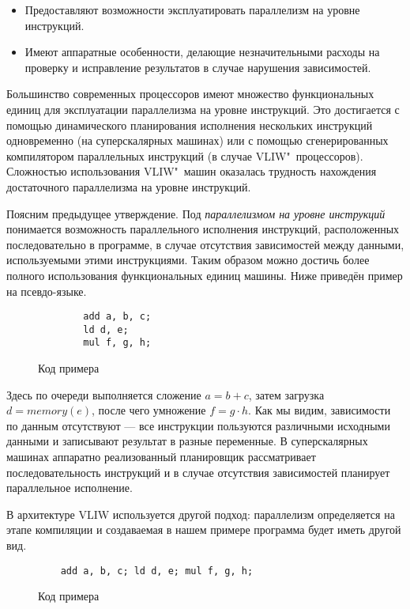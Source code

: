 \begin{itemize}
	\item Предоставляют возможности эксплуатировать параллелизм на уровне инструкций.
	\item Имеют аппаратные особенности, делающие незначительными расходы на проверку и исправление результатов в случае нарушения зависимостей.
\end{itemize}

Большинство современных процессоров имеют множество функциональных единиц для эксплуатации параллелизма на уровне инструкций. Это достигается с помощью динамического планирования исполнения нескольких инструкций одновременно \cite{dynamic-scheduling} (на суперскалярных машинах) или с помощью сгенерированных компилятором параллельных инструкций \cite{vliw} (в случае VLIW"~процессоров). Сложностью использования VLIW"~машин оказалась трудность нахождения достаточного параллелизма на уровне инструкций.

Поясним предыдущее утверждение. Под \emph{параллелизмом на уровне инструкций} понимается возможность параллельного исполнения инструкций, расположенных последовательно в программе, в случае отсутствия зависимостей между данными, используемыми этими инструкциями. Таким образом можно достичь более полного использования функциональных единиц машины. Ниже приведён пример на псевдо-языке.

\begin{figure}[H]
    \begin{verbatim}
        add a, b, c;
        ld d, e; 
        mul f, g, h;
    \end{verbatim}
    \label{fig:ilp}
    \caption{Код примера}
\end{figure}

Здесь по очереди выполняется сложение $a = b + c$, затем загрузка $d = memory(e)$, после чего умножение $f = g \cdot h$. Как мы видим, зависимости по данным отсутствуют --- все инструкции пользуются различными исходными данными и записывают результат в разные переменные. В суперскалярных машинах аппаратно реализованный планировщик рассматривает последовательность инструкций и в случае отсутствия зависимостей планирует параллельное исполнение.

В архитектуре VLIW используется другой подход: параллелизм определяется на этапе компиляции и создаваемая в нашем примере программа будет иметь другой вид.

\begin{figure}[H]
    \begin{verbatim}
    add a, b, c; ld d, e; mul f, g, h;
    \end{verbatim}
    \label{fig:vliw}
    \caption{Код примера}
\end{figure}


